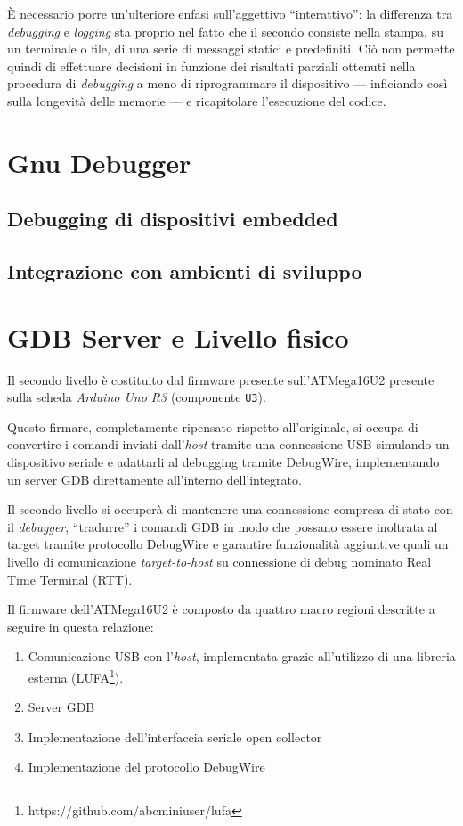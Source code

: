 È necessario porre un'ulteriore enfasi sull'aggettivo ``interattivo'': la differenza tra \textit{debugging} e \textit{logging} sta proprio nel fatto che il secondo consiste nella stampa, su un terminale o file, di una serie di messaggi statici e predefiniti. Ciò non permette quindi di effettuare decisioni in funzione dei risultati parziali ottenuti nella procedura di \textit{debugging} a meno di riprogrammare il dispositivo --- inficiando così sulla longevità delle memorie --- e ricapitolare l'esecuzione del codice.

\section{Gnu Debugger}\label{sec:gdb}
\subsection{Debugging di dispositivi embedded}
\subsection{Integrazione con ambienti di sviluppo}

\section{GDB Server e Livello fisico}

Il secondo livello è costituito dal firmware presente sull'ATMega16U2 presente sulla scheda \textit{Arduino Uno R3} (componente \texttt{U3}).

Questo firmare, completamente ripensato rispetto all'originale, si occupa di convertire i comandi inviati dall'\textit{host} tramite una connessione USB simulando un dispositivo seriale e adattarli al debugging tramite DebugWire, implementando un server GDB direttamente all'interno dell'integrato.

Il secondo livello si occuperà di mantenere una connessione compresa di stato con il \textit{debugger}, ``tradurre'' i comandi GDB in modo che possano essere inoltrata al target tramite protocollo DebugWire e garantire funzionalità aggiuntive quali un livello di comunicazione \textit{target-to-host} su connessione di debug nominato Real Time Terminal (RTT).

Il firmware dell'ATMega16U2 è composto da quattro macro regioni descritte a seguire in questa relazione:
\begin{enumerate}
    \item Comunicazione USB con l'\textit{host}, implementata grazie all'utilizzo di una libreria esterna (LUFA\footnote{https://github.com/abcminiuser/lufa}).
    \item Server GDB
    \item Implementazione dell'interfaccia seriale open collector
    \item Implementazione del protocollo DebugWire
\end{enumerate}

